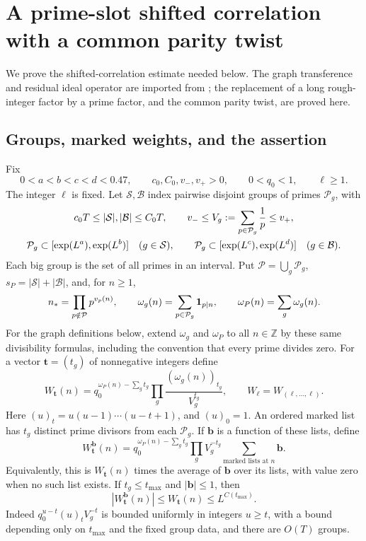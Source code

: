 \section{A prime-slot shifted correlation with a common parity twist}
\label{sh:section}

We prove the shifted-correlation estimate needed below.  The graph
transference and residual ideal operator are imported from
\cite{SmoothShifted}; the replacement of a long rough-integer factor by
a prime factor, and the common parity twist, are proved here.

\subsection{Groups, marked weights, and the assertion}

Fix
\[
 0<a<b<c<d<0.47,\qquad c_0,C_0,v_-,v_+>0,
 \qquad 0<q_0<1,\qquad \ell\geq1.
\]
The integer $\ell$ is fixed.  Let $\mathcal S,\mathcal B$ index
pairwise disjoint groups of primes $\mathcal P_g$, with
\begin{gather}
 c_0T\leq |\mathcal S|,|\mathcal B|\leq C_0T,
 \qquad v_-\leq V_g:=\sum_{p\in\mathcal P_g}\frac1p\leq v_+,
 \label{sh:groups}\\
 \mathcal P_g\subset[\exp(L^a),\exp(L^b)]\quad(g\in\mathcal S),
 \qquad
 \mathcal P_g\subset[\exp(L^c),\exp(L^d)]\quad(g\in\mathcal B).
 \notag
\end{gather}
Each big group is the set of all primes in an interval.  Put
$\mathcal P=\bigcup_g\mathcal P_g$, $s_P=|\mathcal S|+|\mathcal B|$,
and, for $n\geq1$,
\[
 n_*=\prod_{p\notin\mathcal P}p^{v_p(n)},\qquad
 \omega_g(n)=\sum_{p\in\mathcal P_g}\mathbf{1}_{p\mid n},\qquad
 \omega_P(n)=\sum_g\omega_g(n).
\]
For the graph definitions below, extend $\omega_g$ and $\omega_P$
to all $n\in\mathbb Z$ by these same divisibility formulas, including
the convention that every prime divides zero.
For a vector $\mathbf t=(t_g)$ of nonnegative integers define
\begin{equation}\label{sh:marked-weight}
 W_{\mathbf t}(n)=q_0^{\omega_P(n)-\sum_g t_g}
                   \prod_g\frac{(\omega_g(n))_{t_g}}{V_g^{t_g}},
 \qquad W_\ell=W_{(\ell,\ldots,\ell)}.
\end{equation}
Here $(u)_t=u(u-1)\cdots(u-t+1)$, and $(u)_0=1$.
An ordered marked list has $t_g$ distinct prime divisors from each
$\mathcal P_g$.  If $\mathbf b$ is a function of these lists, define
\[
 W_{\mathbf t}^{\mathbf b}(n)
 =q_0^{\omega_P(n)-\sum_g t_g}
       \prod_g V_g^{-t_g}\sum_{\text{marked lists at }n}\mathbf b.
\]
Equivalently, this is $W_{\mathbf t}(n)$ times the average of
$\mathbf b$ over its lists, with value zero when no such list exists.
If $t_g\leq t_{\max}$ and $|\mathbf b|\leq1$, then
\begin{equation}\label{sh:weight-bound}
 |W_{\mathbf t}^{\mathbf b}(n)|\leq W_{\mathbf t}(n)
 \leq L^{C(t_{\max})}.
\end{equation}
Indeed $q_0^{u-t}(u)_tV_g^{-t}$ is bounded uniformly in integers
$u\geq t$, with a bound depending only on $t_{\max}$ and the fixed
group data, and there are $O(T)$ groups.

